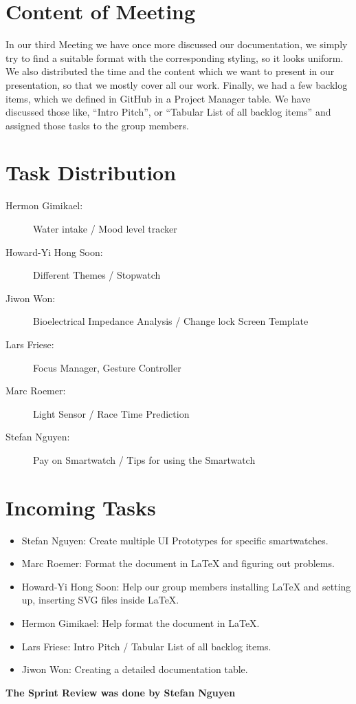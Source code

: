 \documentclass{article}
\begin{document}
\section*{Content of Meeting}
In our third Meeting we have once more discussed our documentation, we simply try to find a suitable format with the corresponding styling, so it looks uniform. We also distributed the time and the content which we want to present in our presentation, so that we mostly cover all our work. Finally, we had a few backlog items, which we defined in GitHub in a Project Manager table. We have discussed those like, “Intro Pitch”, or “Tabular List of all backlog items” and assigned those tasks to the group members. 

\section*{Task Distribution}
\begin{description}
    \item[Hermon Gimikael:] Water intake / Mood level tracker 
    \item[Howard-Yi Hong Soon:] Different Themes / Stopwatch
    \item[Jiwon Won:] Bioelectrical Impedance Analysis / Change lock Screen Template
    \item[Lars Friese:] Focus Manager, Gesture Controller
    \item[Marc Roemer:] Light Sensor / Race Time Prediction 
    \item[Stefan Nguyen:] Pay on Smartwatch / Tips for using the Smartwatch
\end{description}

\section*{Incoming Tasks}
\begin{itemize}
    \item Stefan Nguyen: Create multiple UI Prototypes for specific smartwatches.
    \item Marc Roemer: Format the document in LaTeX and figuring out problems.
    \item Howard-Yi Hong Soon: Help our group members installing LaTeX and setting up, inserting SVG files inside LaTeX.
    \item Hermon Gimikael: Help format the document in LaTeX.
    \item Lars Friese: Intro Pitch / Tabular List of all backlog items.
    \item Jiwon Won: Creating a detailed documentation table.
\end{itemize}
\noindent
\textbf{The Sprint Review was done by Stefan Nguyen}
\newpage
\end{document}
